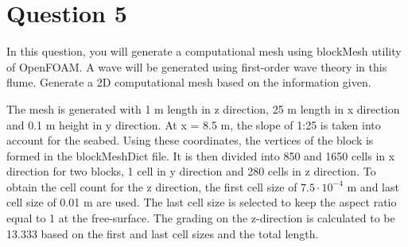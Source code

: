 \documentclass[a4paper]{article}
\begin{document}
\section{Question 5} In this question, you will generate a computational mesh using blockMesh utility of OpenFOAM. A wave will be generated using first-order wave theory in this flume. Generate a 2D computational mesh based on the information given.


The mesh is generated with 1 m length in z direction, 25 m length in x direction and 0.1 m height in y direction. At x = 8.5 m, the slope of 1:25 is taken into account for the seabed. Using these coordinates, the vertices of the block is formed in the blockMeshDict file. It is then divided into 850 and 1650 cells in x direction for two blocks, 1 cell in y direction and 280 cells in z direction. To obtain the cell count for the z direction, the first cell size of $7.5 \cdot 10^{-4}$ m and last cell size of 0.01 m are used. The last cell size is selected to keep the aspect ratio equal to 1 at the free-surface. The grading on the z-direction is calculated to be 13.333 based on the first and last cell sizes and the total length.
\end{document}
